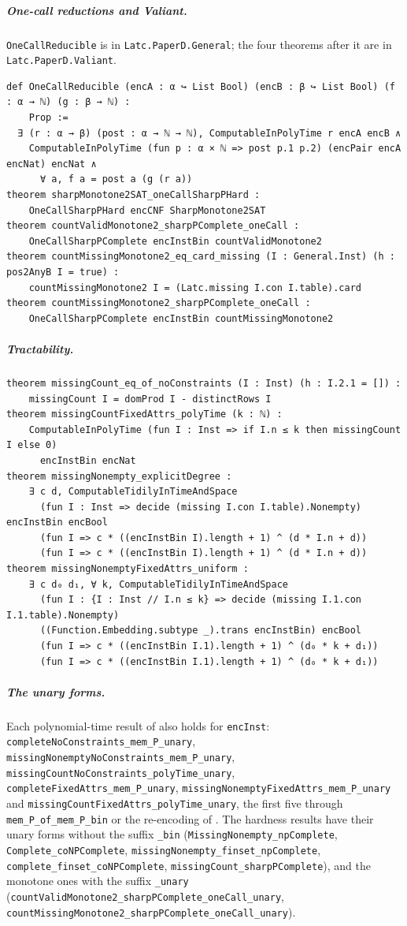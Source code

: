 \documentclass[pdflatex,sn-mathphys-num]{sn-jnl}
\theoremstyle{thmstyleone}
\theoremstyle{thmstylethree}
\begin{document}
\begin{appendices}
\subparagraph*{One-call reductions and Valiant.}
\lstinline{OneCallReducible} is in \lstinline{Latc.PaperD.General}; the four theorems after it are in
\lstinline{Latc.PaperD.Valiant}.
\begin{lstlisting}
def OneCallReducible (encA : α ↪ List Bool) (encB : β ↪ List Bool) (f : α → ℕ) (g : β → ℕ) :
    Prop :=
  ∃ (r : α → β) (post : α → ℕ → ℕ), ComputableInPolyTime r encA encB ∧
    ComputableInPolyTime (fun p : α × ℕ => post p.1 p.2) (encPair encA encNat) encNat ∧
      ∀ a, f a = post a (g (r a))
theorem sharpMonotone2SAT_oneCallSharpPHard :
    OneCallSharpPHard encCNF SharpMonotone2SAT
theorem countValidMonotone2_sharpPComplete_oneCall :
    OneCallSharpPComplete encInstBin countValidMonotone2
theorem countMissingMonotone2_eq_card_missing (I : General.Inst) (h : pos2AnyB I = true) :
    countMissingMonotone2 I = (Latc.missing I.con I.table).card
theorem countMissingMonotone2_sharpPComplete_oneCall :
    OneCallSharpPComplete encInstBin countMissingMonotone2
\end{lstlisting}

\subparagraph*{Tractability.}
\begin{lstlisting}
theorem missingCount_eq_of_noConstraints (I : Inst) (h : I.2.1 = []) :
    missingCount I = domProd I - distinctRows I
theorem missingCountFixedAttrs_polyTime (k : ℕ) :
    ComputableInPolyTime (fun I : Inst => if I.n ≤ k then missingCount I else 0)
      encInstBin encNat
theorem missingNonempty_explicitDegree :
    ∃ c d, ComputableTidilyInTimeAndSpace
      (fun I : Inst => decide (missing I.con I.table).Nonempty) encInstBin encBool
      (fun I => c * ((encInstBin I).length + 1) ^ (d * I.n + d))
      (fun I => c * ((encInstBin I).length + 1) ^ (d * I.n + d))
theorem missingNonemptyFixedAttrs_uniform :
    ∃ c d₀ d₁, ∀ k, ComputableTidilyInTimeAndSpace
      (fun I : {I : Inst // I.n ≤ k} => decide (missing I.1.con I.1.table).Nonempty)
      ((Function.Embedding.subtype _).trans encInstBin) encBool
      (fun I => c * ((encInstBin I.1).length + 1) ^ (d₀ * k + d₁))
      (fun I => c * ((encInstBin I.1).length + 1) ^ (d₀ * k + d₁))
\end{lstlisting}

\subparagraph*{The unary forms.}
Each polynomial-time result of  also holds for \lstinline{encInst}:
\lstinline{completeNoConstraints_mem_P_unary}, \lstinline{missingNonemptyNoConstraints_mem_P_unary},
\lstinline{missingCountNoConstraints_polyTime_unary}, \lstinline{completeFixedAttrs_mem_P_unary},
\lstinline{missingNonemptyFixedAttrs_mem_P_unary} and \lstinline{missingCountFixedAttrs_polyTime_unary},
the first five through \lstinline{mem_P_of_mem_P_bin} or the re-encoding of .
The hardness results have their unary forms without the suffix \lstinline{_bin}
(\lstinline{MissingNonempty_npComplete}, \lstinline{Complete_coNPComplete},
\lstinline{missingNonempty_finset_npComplete}, \lstinline{complete_finset_coNPComplete},
\lstinline{missingCount_sharpPComplete}), and the monotone ones with the suffix
\lstinline{_unary} (\lstinline{countValidMonotone2_sharpPComplete_oneCall_unary},
\lstinline{countMissingMonotone2_sharpPComplete_oneCall_unary}).


\end{appendices}
\end{document}
